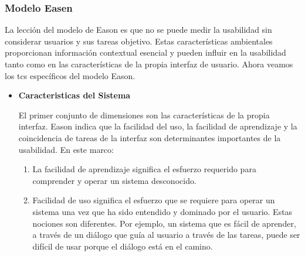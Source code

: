 \documentclass[11pt]{article}
\begin{document}
\begin{normalsize}
\begin{flushleft}
        \subsubsection{Modelo Easen}
            \begin{itemize}La lección del modelo de Eason es que no se puede medir la usabilidad sin considerar usuarios y sus tareas objetivo. Estas características ambientales proporcionan información contextual esencial y pueden influir en la usabilidad tanto como en las características de la propia interfaz de usuario. Ahora veamos los tcs específicos del modelo Eason.
            \end{itemize}
            
            \begin{itemize}
                \item \textbf{Caracteristicas del Sistema}
                    \begin{itemize}
                        El primer conjunto de dimensiones son las características de la propia interfaz.
                        Eason indica que la facilidad del uso, la facilidad de aprendizaje y la coincidencia de tareas de la interfaz son determinantes importantes de la usabilidad.
                        En este marco:
                    \end{itemize}
                    
                    \begin{itemize}
                    \begin{enumerate}
                        \item La facilidad de aprendizaje significa el esfuerzo requerido para comprender y operar un sistema desconocido.
                        
                        \item Facilidad de uso significa el esfuerzo que se requiere para operar un sistema una vez que ha sido entendido y dominado por el usuario. Estas nociones son diferentes. Por ejemplo, un sistema que es fácil de aprender, a través de un diálogo que guía al usuario a través de las tareas, puede ser difícil de usar porque el diálogo está en el camino.                  
                        

\end{enumerate}
\end{itemize}
\end{itemize}
\end{flushleft}
\end{normalsize}
\end{document}
